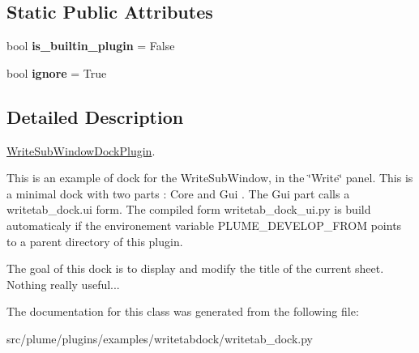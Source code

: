 \subsection*{Static Public Attributes}
\begin{DoxyCompactItemize}
\item 
bool {\bfseries is\+\_\+builtin\+\_\+plugin} = False\hypertarget{classplume-creator_1_1src_1_1plume_1_1plugins_1_1examples_1_1writetabdock_1_1writetab__dock_1_1_write_sub_window_dock_plugin_a6e14a6dc5ea9405ce5d06485066e14d8}{}\label{classplume-creator_1_1src_1_1plume_1_1plugins_1_1examples_1_1writetabdock_1_1writetab__dock_1_1_write_sub_window_dock_plugin_a6e14a6dc5ea9405ce5d06485066e14d8}

\item 
bool {\bfseries ignore} = True\hypertarget{classplume-creator_1_1src_1_1plume_1_1plugins_1_1examples_1_1writetabdock_1_1writetab__dock_1_1_write_sub_window_dock_plugin_a0b1cf5b7894e8f425abe132935f3e012}{}\label{classplume-creator_1_1src_1_1plume_1_1plugins_1_1examples_1_1writetabdock_1_1writetab__dock_1_1_write_sub_window_dock_plugin_a0b1cf5b7894e8f425abe132935f3e012}

\end{DoxyCompactItemize}


\subsection{Detailed Description}
\hyperlink{classplume-creator_1_1src_1_1plume_1_1plugins_1_1examples_1_1writetabdock_1_1writetab__dock_1_1_write_sub_window_dock_plugin}{Write\+Sub\+Window\+Dock\+Plugin}. 

This is an example of dock for the Write\+Sub\+Window, in the \char`\"{}\+Write\char`\"{} panel. This is a minimal dock with two parts \+: Core and Gui . The Gui part calls a writetab\+\_\+dock.\+ui form. The compiled form writetab\+\_\+dock\+\_\+ui.\+py is build automaticaly if the environement variable P\+L\+U\+M\+E\+\_\+\+D\+E\+V\+E\+L\+O\+P\+\_\+\+F\+R\+OM points to a parent directory of this plugin.

The goal of this dock is to display and modify the title of the current sheet. Nothing really useful... 

The documentation for this class was generated from the following file\+:\begin{DoxyCompactItemize}
\item 
src/plume/plugins/examples/writetabdock/writetab\+\_\+dock.\+py\end{DoxyCompactItemize}
